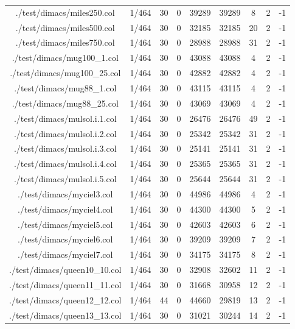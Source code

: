 \begin{table}[htb]
\begin{tabular}{@{}ccccccccc@{}}
        ./test/dimacs/miles250.col & 1/464 & 30 & 0 & 39289 & 39289 & 8 & 2 & -1 \\
        ./test/dimacs/miles500.col & 1/464 & 30 & 0 & 32185 & 32185 & 20 & 2 & -1 \\
        ./test/dimacs/miles750.col & 1/464 & 30 & 0 & 28988 & 28988 & 31 & 2 & -1 \\
        ./test/dimacs/mug100\_1.col & 1/464 & 30 & 0 & 43088 & 43088 & 4 & 2 & -1 \\
        ./test/dimacs/mug100\_25.col & 1/464 & 30 & 0 & 42882 & 42882 & 4 & 2 & -1 \\
        ./test/dimacs/mug88\_1.col & 1/464 & 30 & 0 & 43115 & 43115 & 4 & 2 & -1 \\
        ./test/dimacs/mug88\_25.col & 1/464 & 30 & 0 & 43069 & 43069 & 4 & 2 & -1 \\
        ./test/dimacs/mulsol.i.1.col & 1/464 & 30 & 0 & 26476 & 26476 & 49 & 2 & -1 \\
        ./test/dimacs/mulsol.i.2.col & 1/464 & 30 & 0 & 25342 & 25342 & 31 & 2 & -1 \\
        ./test/dimacs/mulsol.i.3.col & 1/464 & 30 & 0 & 25141 & 25141 & 31 & 2 & -1 \\
        ./test/dimacs/mulsol.i.4.col & 1/464 & 30 & 0 & 25365 & 25365 & 31 & 2 & -1 \\
        ./test/dimacs/mulsol.i.5.col & 1/464 & 30 & 0 & 25644 & 25644 & 31 & 2 & -1 \\
        ./test/dimacs/myciel3.col & 1/464 & 30 & 0 & 44986 & 44986 & 4 & 2 & -1 \\
        ./test/dimacs/myciel4.col & 1/464 & 30 & 0 & 44300 & 44300 & 5 & 2 & -1 \\
        ./test/dimacs/myciel5.col & 1/464 & 30 & 0 & 42603 & 42603 & 6 & 2 & -1 \\
        ./test/dimacs/myciel6.col & 1/464 & 30 & 0 & 39209 & 39209 & 7 & 2 & -1 \\
        ./test/dimacs/myciel7.col & 1/464 & 30 & 0 & 34175 & 34175 & 8 & 2 & -1 \\
        ./test/dimacs/queen10\_10.col & 1/464 & 30 & 0 & 32908 & 32602 & 11 & 2 & -1 \\
        ./test/dimacs/queen11\_11.col & 1/464 & 30 & 0 & 31668 & 30958 & 12 & 2 & -1 \\
        ./test/dimacs/queen12\_12.col & 1/464 & 44 & 0 & 44660 & 29819 & 13 & 2 & -1 \\
        ./test/dimacs/queen13\_13.col & 1/464 & 30 & 0 & 31021 & 30244 & 14 & 2 & -1 \\

\end{tabular}
\end{table}
